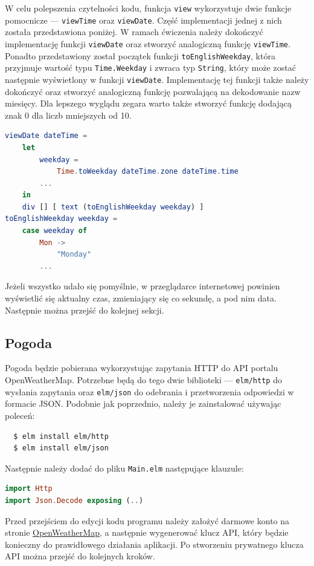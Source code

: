 \documentclass[twoside,a4paper]{report}
\begin{document}
W celu polepszenia czytelności kodu, funkcja \texttt{view} wykorzystuje dwie funkcje pomocnicze --- \texttt{viewTime} oraz \texttt{viewDate}.
Część implementacji jednej z nich została przedstawiona poniżej.
W ramach ćwiczenia należy dokończyć implementację funkcji \texttt{viewDate} oraz stworzyć analogiczną funkcję \texttt{viewTime}.
Ponadto przedstawiony został początek funkcji \texttt{toEnglishWeekday}, która przyjmuje wartość typu \texttt{Time.Weekday} i zwraca typ \texttt{String}, który może zostać następnie wyświetlony w funkcji \texttt{viewDate}.
Implementację tej funkcji także należy dokończyć oraz stworzyć analogiczną funkcję pozwalającą na dekodowanie nazw miesięcy.
Dla lepszego wyglądu zegara warto także stworzyć funkcję dodającą znak 0 dla liczb mniejszych od 10.
\begin{lstlisting}[language=Elm]
viewDate dateTime =
    let
        weekday =
            Time.toWeekday dateTime.zone dateTime.time
        ...
    in
    div [] [ text (toEnglishWeekday weekday) ]
toEnglishWeekday weekday =
    case weekday of
        Mon ->
            "Monday"
        ...
\end{lstlisting}

Jeżeli wszystko udało się pomyślnie, w przeglądarce internetowej powinien wyświetlić się aktualny czas, zmieniający się co sekundę, a pod nim data.
Następnie można przejść do kolejnej sekcji.

\subsection*{Pogoda}
Pogoda będzie pobierana wykorzystując zapytania HTTP do API portalu OpenWeatherMap\@.
Potrzebne będą do tego dwie biblioteki --- \texttt{elm/http} do wysłania zapytania oraz \texttt{elm/json} do odebrania i przetworzenia odpowiedzi w formacie JSON\@.
Podobnie jak poprzednio, należy je zainstalować używając poleceń:
\begin{lstlisting}
  $ elm install elm/http
  $ elm install elm/json
\end{lstlisting}
Następnie należy dodać do pliku \texttt{Main.elm} następujące klauzule:

\begin{lstlisting}[language=Elm]
import Http
import Json.Decode exposing (..)
\end{lstlisting}

Przed przejściem do edycji kodu programu należy założyć darmowe konto na stronie \href{https://openweathermap.org/}{OpenWeatherMap}, a następnie wygenerować klucz API, który będzie konieczny do prawidłowego działania aplikacji.
Po stworzeniu prywatnego klucza API można przejść do kolejnych kroków.
\end{document}
